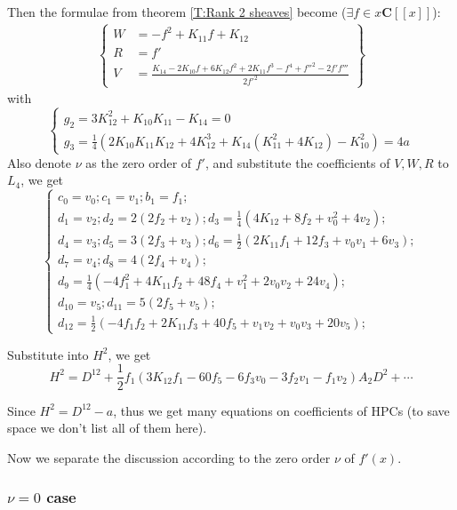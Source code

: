 \documentclass[11pt]{article}
\theoremstyle{definition}
\theoremstyle{plain}
\numberwithin{equation}{section}
\begin{document}
Then the formulae from theorem \ref{T:Rank 2 sheaves} become ($\exists f\in x\mathbf{C}[[x]]$):
\begin{align}
	\label{E:Gr non self}
	\left\{\begin{aligned}
	W&=-f^2+K_{11}f+K_{12}
	\\R&=f'
	\\V&=\frac{K_{14}-2K_{10}f+6K_{12}f^2+2K_{11}f^3-f^4+f''^2-2f'f'''}{2f'^2}
	\end{aligned}\right\}
\end{align}
with 
$$
\begin{cases}
	g_2=3K_{12}^2+K_{10}K_{11}-K_{14}=0
	\\g_3=\frac{1}{4}(2K_{10}K_{11}K_{12}+4K_{12}^3+K_{14}(K_{11}^2+4K_{12})-K_{10}^2)=4a
\end{cases}
$$
Also denote $\nu$ as the zero order of $f'$, and substitute the coefficients of $V,W,R$ to $L_4$, we get
$$
\begin{cases}
	c_0=v_0; c_1=v_1;b_1=f_1;
	\\ d_1 = v_2; d_2 = 2 (2 f_2 + v_2); d_3 = \frac{1}{4} (4 K_{12} + 8 f_2 + v_0^2 + 4 v_2);
	\\d_4 = v_3; d_5 = 3 (2f_3 + v_3); d_6 = \frac{1}{2} (2 K_{11} f_1 + 12 f_3 + v_0 v_1 + 6 v_3);
	\\d_7 = v_4; d_8 = 4 (2 f_4 + v_4); 
	\\d_9 = 
	\frac{1}{4} (-4 f_1^2 + 4 K_{11} f_2 + 48 f_4 + v_1^2 + 2 v_0 v_2 + 
	24 v_4);
	\\d_{10} = v_5; d_{11} = 5 (2 f_5 + v_5); 
	\\d_{12} = \frac{1}{2} (-4 f_1 f_2 + 2 K_{11} f_3 + 40 f_5 + v_1 v_2 + v_0 v_3 + 20 v_5);
\end{cases}  
$$

Substitute into $H^2$, we get
\begin{equation}
	\label{E:f in non self adjoint}
H^2=D^{12}+\frac{1}{2} f_1 (3 K_{12} f_1 - 60 f_5 - 6 f_3 v_0 - 3 f_2 v_1 - f_1 v_2)A_2D^2+\cdots
\end{equation}

Since $H^2=D^{12}-a$, thus we get many equations on coefficients of HPCs (to save space we don't list all of them here). 

Now we separate the discussion according to the zero order $\nu$ of $f'(x)$.

\subsubsection{$\nu=0$ case}
\end{document}
